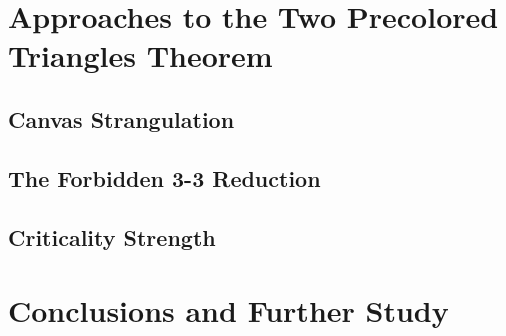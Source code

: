 \documentclass{article}
\theoremstyle{definition}
\begin{document}
\newpage


\newpage

\tableofcontents

\newpage










\section{Approaches to the Two Precolored Triangles Theorem}

\subsection{Canvas Strangulation}

\subsection{The Forbidden 3-3 Reduction}

\subsection{Criticality Strength}


\section{Conclusions and Further Study}

\newpage


\printbibliography
\end{document}

